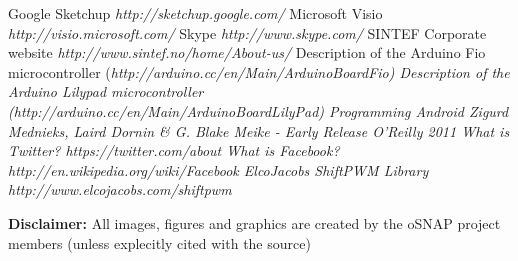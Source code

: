 \begin{thebibliography}{99}
 Google Sketchup {\em http://sketchup.google.com/}
 Microsoft Visio {\em http://visio.microsoft.com/}
 Skype {\em http://www.skype.com/}
 SINTEF Corporate website {\em http://www.sintef.no/home/About-us/}
 Description of the Arduino Fio microcontroller (\em http://arduino.cc/en/Main/ArduinoBoardFio)
  Description of the Arduino Lilypad microcontroller (\em http://arduino.cc/en/Main/ArduinoBoardLilyPad)
 Programming Android {\em Zigurd Mednieks, Laird Dornin \& G. Blake Meike - Early Release O'Reilly 2011}
 What is Twitter? {\em https://twitter.com/about}
 What is Facebook? {\em http://en.wikipedia.org/wiki/Facebook}
 ElcoJacobs ShiftPWM Library {\em http://www.elcojacobs.com/shiftpwm}
\end{thebibliography}


\textbf{Disclaimer:}
All images, figures and graphics are created by the oSNAP project members (unless explecitly cited with the source)
